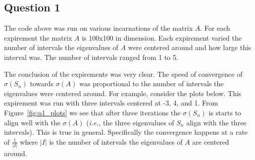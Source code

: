 \subsection{Question 1}


The code above was run on various incarnations of the matrix \(A\).
For each expirement the matrix \(A\) is 100x100 in dimension.
Each expirement varied the number of intervals the eigenvalues of \(A\) were centered around and how large this interval was.
The number of intervals ranged from 1 to 5.

The conclusion of the expirements was very clear.
The speed of convergence of \(\sigma (S_n)\) towards \(\sigma (A)\) was proportional to the number of intervals the eigenvalues were centered around.
For example, consider the plots below.
This expirement was run with three intervals centered at -3, 4, and 1.
From Figure~\ref{fig:q1_plots}  we see that after three iterations the \(\sigma (S_n)\) is starts to align well with the \(\sigma (A)\) ({\em i.e.,} the three eigenvalues of \(S_n\) align with the three intervals).
This is true in general.
Specifically the convergence happens at a rate of \(\frac{1}{|I|}\) where \(|I|\) is the number of intervals the eigenvalues of \(A\) are centered around.

\newpage



